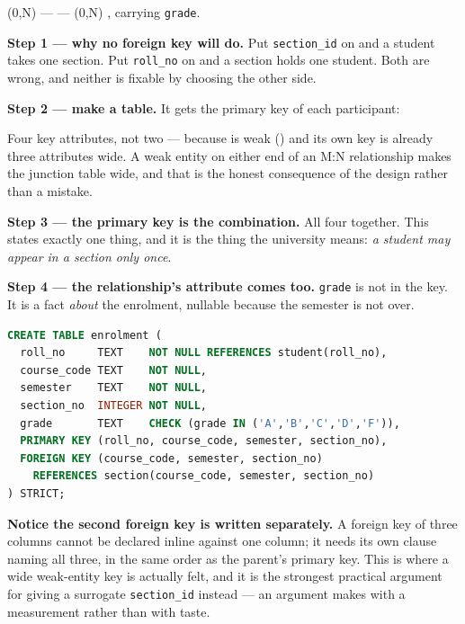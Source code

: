 \begin{worked}
 (0,N) ---  --- (0,N) , carrying
\texttt{grade}.

\medskip
\textbf{Step 1 --- why no foreign key will do.} Put \texttt{section\_id} on
 and a student takes one section. Put \texttt{roll\_no} on
 and a section holds one student. Both are wrong, and neither is
fixable by choosing the other side.

\medskip
\textbf{Step 2 --- make a table.} It gets the primary key of each participant:

\medskip
{}

\medskip
Four key attributes, not two --- because  is weak
() and its own key is already three attributes wide. A weak
entity on either end of an M:N relationship makes the junction table wide, and
that is the honest consequence of the design rather than a mistake.

\medskip
\textbf{Step 3 --- the primary key is the combination.} All four together.
This states exactly one thing, and it is the thing the university means:
\emph{a student may appear in a section only once}.

\medskip
\textbf{Step 4 --- the relationship's attribute comes too.} \texttt{grade} is
not in the key. It is a fact \emph{about} the enrolment, nullable because the
semester is not over.

\medskip
\begin{lstlisting}[language=sql]
CREATE TABLE enrolment (
  roll_no     TEXT    NOT NULL REFERENCES student(roll_no),
  course_code TEXT    NOT NULL,
  semester    TEXT    NOT NULL,
  section_no  INTEGER NOT NULL,
  grade       TEXT    CHECK (grade IN ('A','B','C','D','F')),
  PRIMARY KEY (roll_no, course_code, semester, section_no),
  FOREIGN KEY (course_code, semester, section_no)
    REFERENCES section(course_code, semester, section_no)
) STRICT;
\end{lstlisting}

\smallskip
\textbf{Notice the second foreign key is written separately.} A foreign key of
three columns cannot be declared inline against one column; it needs its own
 clause naming all three, in the same order as the parent's
primary key. This is where a wide weak-entity key is actually felt, and it is
the strongest practical argument for giving  a surrogate
\texttt{section\_id} instead --- an argument  makes with a
measurement rather than with taste.
\end{worked}

